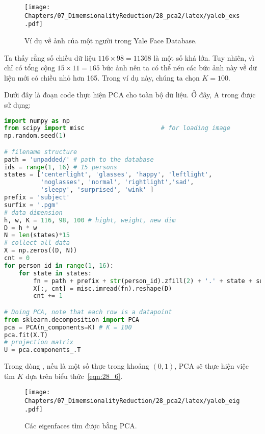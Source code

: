 
\begin{figure}[t]
\centering
\texttt{[image: Chapters/07\_DimemsionalityReduction/28\_pca2/latex/yaleb\_exs.pdf]}
\caption[]{Ví dụ về ảnh của một người trong Yale Face Database.}
\label{fig:28_1}
\end{figure}
Ta thấy rằng số chiều dữ liệu $116 \times 98 = 11368$ là một số khá
lớn. Tuy nhiên, vì chỉ có tổng cộng $15 \times 11 = 165$ bức ảnh nên ta có thể
nén các bức ảnh này về dữ liệu mới có chiều nhỏ hơn 165. Trong ví dụ này, chúng
ta chọn $K = 100$.

Dưới đây là đoạn code thực hiện PCA cho toàn bộ dữ liệu. Ở đây, A trong  được sử dụng:
\newpage
\begin{lstlisting}[language=Python]
import numpy as np
from scipy import misc                     # for loading image
np.random.seed(1)

# filename structure
path = 'unpadded/' # path to the database
ids = range(1, 16) # 15 persons
states = ['centerlight', 'glasses', 'happy', 'leftlight',
          'noglasses', 'normal', 'rightlight','sad',
          'sleepy', 'surprised', 'wink' ]
prefix = 'subject'
surfix = '.pgm'
# data dimension
h, w, K = 116, 98, 100 # hight, weight, new dim
D = h * w
N = len(states)*15
# collect all data
X = np.zeros((D, N))
cnt = 0
for person_id in range(1, 16):
    for state in states:
        fn = path + prefix + str(person_id).zfill(2) + '.' + state + surfix
        X[:, cnt] = misc.imread(fn).reshape(D)
        cnt += 1

# Doing PCA, note that each row is a datapoint
from sklearn.decomposition import PCA
pca = PCA(n_components=K) # K = 100
pca.fit(X.T)
# projection matrix
U = pca.components_.T
\end{lstlisting}


Trong dòng , nếu
 là một số thực trong khoảng $(0, 1)$, PCA sẽ thực
hiện việc tìm $K$ dựa trên biểu thức~\eqref{eqn:28_6}.

\begin{figure}[t]
\centering
\texttt{[image: Chapters/07\_DimemsionalityReduction/28\_pca2/latex/yaleb\_eig.pdf]}
\caption[]{Các eigenfaces tìm được bằng PCA.}
\label{fig:28_2}
\end{figure}

